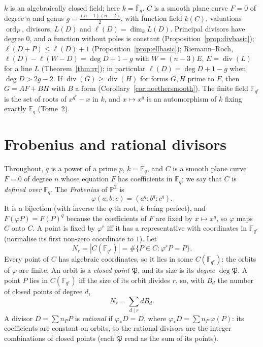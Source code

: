 \begin{reminder}
$k$ is an algebraically closed field; here $k=\overline{\mathbb F}_q$. $C$ is a smooth plane curve $F=0$ of degree $n$ and genus $g=\frac{(n-1)(n-2)}2$, with function
field $k(C)$, valuations $\operatorname{ord}_P$, divisors, $L(D)$ and $\ell(D)=\dim_kL(D)$. Principal divisors have degree $0$, and a function without poles is
constant (Proposition~\ref{prop:divbasic}); $\ell(D+P)\le\ell(D)+1$ (Proposition~\ref{prop:ellbasic}); Riemann--Roch, $\ell(D)-\ell(W-D)=\deg D+1-g$ with
$W=(n-3)E$, $E=\operatorname{div}(L)$ for a line $L$ (Theorem~\ref{thm:rr}); in particular $\ell(D)=\deg D+1-g$ when $\deg D>2g-2$. If $\operatorname{div}(G)\ge\operatorname{div}(H)$
for forms $G,H$ prime to $F$, then $G=AF+BH$ with $B$ a form (Corollary~\ref{cor:noethersmooth}). The finite field $\mathbb F_{q^r}$ is the set of roots of
$x^{q^r}-x$ in $k$, and $x\mapsto x^q$ is an automorphism of $k$ fixing exactly $\mathbb F_q$ (Tome~2).
\end{reminder}

\section{Frobenius and rational divisors}

Throughout, $q$ is a power of a prime $p$, $k=\overline{\mathbb F}_q$, and $C$ is a smooth plane curve $F=0$ of degree $n$ whose equation $F$ has coefficients in
$\mathbb F_q$; we say that $C$ is \emph{defined over $\mathbb F_q$}. The \emph{Frobenius} of $\mathbb P^2$ is
\[
\varphi(a:b:c)=(a^q:b^q:c^q).
\]
It is a bijection (with inverse the $q$-th root, $k$ being perfect), and $F(\varphi P)=F(P)^q$ because the coefficients of $F$ are fixed by $x\mapsto x^q$, so
$\varphi$ maps $C$ onto $C$. A point is fixed by $\varphi^r$ iff it has a representative with coordinates in $\mathbb F_{q^r}$ (normalise its first non-zero
coordinate to $1$). Let
\[
N_r=|C(\mathbb F_{q^r})|=\#\{P\in C:\varphi^rP=P\}.
\]
Every point of $C$ has algebraic coordinates, so it lies in some $C(\mathbb F_{q^r})$: the orbits of $\varphi$ are finite. An orbit is a \emph{closed point} $\mathfrak P$,
and its size is its \emph{degree} $\deg\mathfrak P$. A point $P$ lies in $C(\mathbb F_{q^r})$ iff the size of its orbit divides $r$, so, with $B_d$ the number of closed
points of degree $d$,
\begin{equation}\label{eq:NrBd}
N_r=\sum_{d\mid r}dB_d.
\end{equation}
A divisor $D=\sum n_PP$ is \emph{rational} if $\varphi_*D=D$, where $\varphi_*D=\sum n_P\,\varphi(P)$: its coefficients are constant on orbits, so the rational
divisors are the integer combinations of closed points (each $\mathfrak P$ read as the sum of its points).

